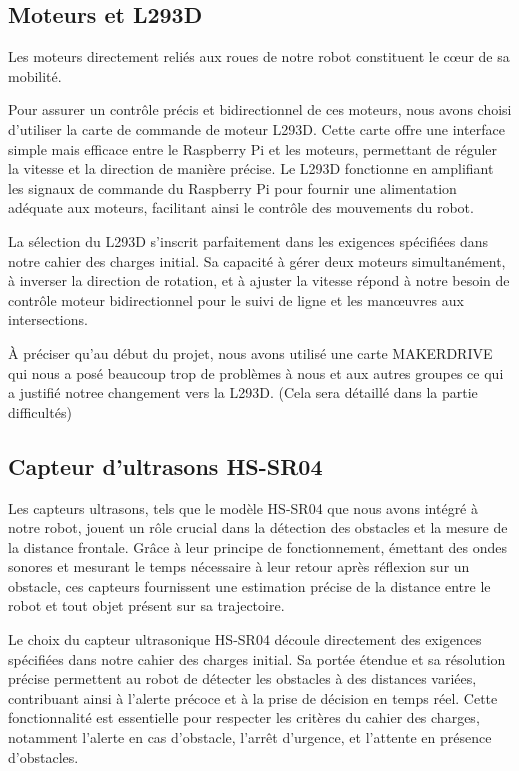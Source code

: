 \subsection{Moteurs et L293D}
Les moteurs directement reliés aux roues de notre robot constituent le cœur de sa mobilité.

Pour assurer un contrôle précis et bidirectionnel de ces moteurs, nous avons choisi d'utiliser la carte de commande de moteur L293D. Cette carte offre une interface simple mais efficace entre le Raspberry Pi et les moteurs, permettant de réguler la vitesse et la direction de manière précise. Le L293D fonctionne en amplifiant les signaux de commande du Raspberry Pi pour fournir une alimentation adéquate aux moteurs, facilitant ainsi le contrôle des mouvements du robot.

La sélection du L293D s'inscrit parfaitement dans les exigences spécifiées dans notre cahier des charges initial. Sa capacité à gérer deux moteurs simultanément, à inverser la direction de rotation, et à ajuster la vitesse répond à notre besoin de contrôle moteur bidirectionnel pour le suivi de ligne et les manœuvres aux intersections.

À préciser qu'au début du projet, nous avons utilisé une carte MAKERDRIVE qui nous a posé beaucoup trop de problèmes à nous et aux autres groupes ce qui a justifié notree changement vers la L293D. (Cela sera détaillé dans la partie difficultés)

\subsection{Capteur d'ultrasons HS-SR04}
Les capteurs ultrasons, tels que le modèle HS-SR04 que nous avons intégré à notre robot, jouent un rôle crucial dans la détection des obstacles et la mesure de la distance frontale. Grâce à leur principe de fonctionnement, émettant des ondes sonores et mesurant le temps nécessaire à leur retour après réflexion sur un obstacle, ces capteurs fournissent une estimation précise de la distance entre le robot et tout objet présent sur sa trajectoire.

Le choix du capteur ultrasonique HS-SR04 découle directement des exigences spécifiées dans notre cahier des charges initial. Sa portée étendue et sa résolution précise permettent au robot de détecter les obstacles à des distances variées, contribuant ainsi à l'alerte précoce et à la prise de décision en temps réel. Cette fonctionnalité est essentielle pour respecter les critères du cahier des charges, notamment l'alerte en cas d'obstacle, l'arrêt d'urgence, et l'attente en présence d'obstacles.

